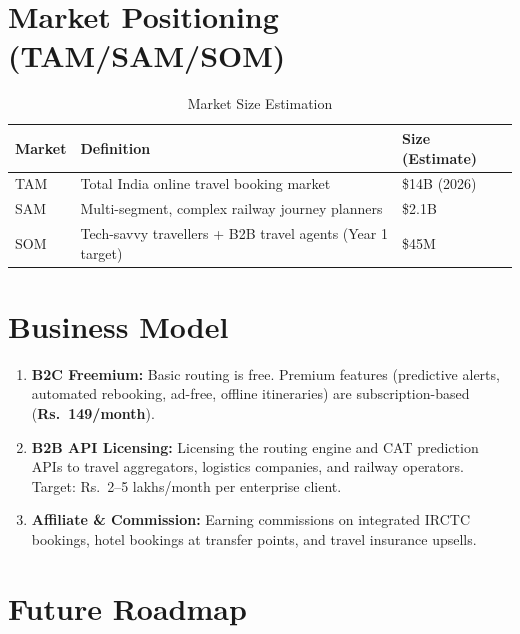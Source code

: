 \documentclass[12pt,a4paper]{report}
\begin{document}
\section{Market Positioning (TAM/SAM/SOM)}

\begin{table}[h!]
\centering
\caption{Market Size Estimation}
\begin{tabularx}{\textwidth}{lXX}
\toprule
\textbf{Market} & \textbf{Definition} & \textbf{Size (Estimate)} \\
\midrule
TAM & Total India online travel booking market & \$14B (2026) \\
SAM & Multi-segment, complex railway journey planners & \$2.1B \\
SOM & Tech-savvy travellers + B2B travel agents (Year 1 target) & \$45M \\
\bottomrule
\end{tabularx}
\end{table}

\section{Business Model}

\begin{enumerate}[leftmargin=1.5em]
  \item \textbf{B2C Freemium:} Basic routing is free. Premium features (predictive alerts, automated rebooking, ad-free, offline itineraries) are subscription-based (\textbf{Rs.\ 149/month}).
  \item \textbf{B2B API Licensing:} Licensing the routing engine and CAT prediction APIs to travel aggregators, logistics companies, and railway operators. Target: Rs.\ 2--5 lakhs/month per enterprise client.
  \item \textbf{Affiliate \& Commission:} Earning commissions on integrated IRCTC bookings, hotel bookings at transfer points, and travel insurance upsells.
\end{enumerate}

\section{Future Roadmap}
\end{document}
